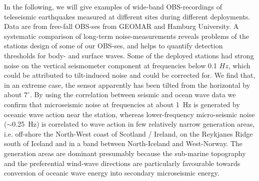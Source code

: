 \documentclass{article}
\begin{document}
{In the following, we will 
give examples of wide-band OBS-recordings of teleseismic 
earthquakes measured at different sites 
during different deployments.
Data are from free-fall OBS-ses from GEOMAR and Hamburg University.
A systematic comparison 
of long-term noise-measurements reveals problems of the stations design of some of our
OBS-ses, and helps to quantify detection thresholds for body- and surface waves.
Some of the deployed stations had strong noise on the vertical seismometer component 
at frequencies below 0.1 $Hz$, which could be attributed to tilt-induced noise and 
could be corrected for.
We find that, in an extreme case, the sensor apparently has been 
tilted 
from the horizontal by about $7^{\circ}$. 
By using the correlation between seismic and ocean wave data we
confirm that microseismic noise at
frequencies at about 1~Hz is generated by oceanic wave action near the
station, whereas lower-frequency micro-seismic noise
($\sim$0.25~Hz) is correlated to wave action in few relatively narrow generation
areas, i.e. 
off-shore the North-West coast of
Scotland / Ireland, on the Reykjanes Ridge south of Iceland and in a band 
between North-Iceland and West-Norway.
The generation areas are dominant presumably because the
sub-marine topography and the preferential wind-wave directions 
are particularly favourable towards
conversion of oceanic wave energy into secondary microseismic energy.

}
\end{document}
